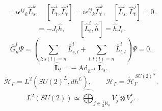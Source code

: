 \documentclass{article}
\begin{document}
\begin{equation}
[\hat L_s^i,\hat L_s^j]=i\epsilon^{ij}{}_k\hat L_s^k,\quad[\hat L_t^i,\hat L_t^j]=i\epsilon^{ij}{}_k\hat L_t^k,\quad[\hat L_s^i,\hat L_t^j]=0.
\tag{H3}
\end{equation}
\begin{equation}
[\hat L_s^i,\hat h]=-J_i\hat h,\qquad[\hat L_t^i,\hat h]=\hat hJ_i.
\tag{H4}
\end{equation}
\begin{equation}
\hat G_n^i\Psi=\left(\sum_{l:s(l)=n}\hat L_{s,l}^i+\sum_{l:t(l)=n}\hat L_{t,l}^i\right)\Psi=0.
\tag{H5}
\end{equation}
\begin{equation}
\hat{\mathbf L}_t=-\operatorname{Ad}_{h^{-1}}\hat{\mathbf L}_s.
\tag{H6}
\end{equation}
\begin{equation}
\widetilde{\mathcal H}_\Gamma=L^2(SU(2)^L,dh^L),\qquad\mathcal H_\Gamma=\widetilde{\mathcal H}_\Gamma^{\,SU(2)^N}.
\tag{S1}
\end{equation}
\begin{equation}
L^2(SU(2))\simeq\widehat{\bigoplus}_{j\in\frac12\mathbb N_0}V_j\otimes V_j^*.
\tag{S2}
\end{equation}
\end{document}
